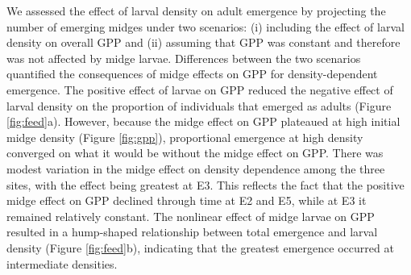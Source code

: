 We assessed the effect of larval density on adult emergence 
by projecting the number of emerging midges under two scenarios: 
(i) including the effect of larval density on overall GPP
and (ii) assuming that GPP was constant and therefore was not affected by midge larvae.  
Differences between the two scenarios quantified the consequences of midge effects on GPP
for density-dependent emergence.
The positive effect of larvae on GPP
reduced the negative effect of larval density
on the proportion of individuals that emerged as adults
(Figure \ref{fig:feed}a).
However, because the midge effect on GPP plateaued at high initial midge density 
(Figure \ref{fig:gpp}),
proportional emergence at high density converged on what it would be 
without the midge effect on GPP.
There was modest variation in the midge effect 
on density dependence among the three sites, with the effect being greatest at E3. 
This reflects the fact that the positive midge effect 
on GPP declined through time at E2 and E5, 
while at E3 it remained relatively constant. 
The nonlinear effect of midge larvae on GPP resulted in a hump-shaped relationship
between total emergence and larval density (Figure \ref{fig:feed}b),
indicating that the greatest emergence occurred at intermediate densities.
